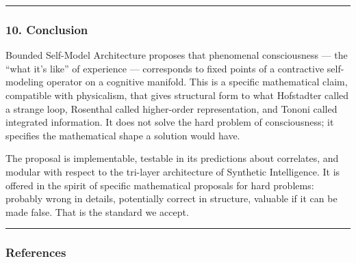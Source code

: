 \documentclass[
  11pt,
  a4paper,
]{article}
\begin{document}
\begin{center}\rule{0.5\linewidth}{0.5pt}\end{center}

\subsubsection{10. Conclusion}\label{conclusion-1}

Bounded Self-Model Architecture proposes that phenomenal consciousness
--- the ``what it's like'' of experience --- corresponds to fixed points
of a contractive self-modeling operator on a cognitive manifold. This is
a specific mathematical claim, compatible with physicalism, that gives
structural form to what Hofstadter called a strange loop, Rosenthal
called higher-order representation, and Tononi called integrated
information. It does not solve the hard problem of consciousness; it
specifies the mathematical shape a solution would have.

The proposal is implementable, testable in its predictions about
correlates, and modular with respect to the tri-layer architecture of
Synthetic Intelligence. It is offered in the spirit of specific
mathematical proposals for hard problems: probably wrong in details,
potentially correct in structure, valuable if it can be made false. That
is the standard we accept.

\begin{center}\rule{0.5\linewidth}{0.5pt}\end{center}

\subsubsection{References}\label{references}
\end{document}
